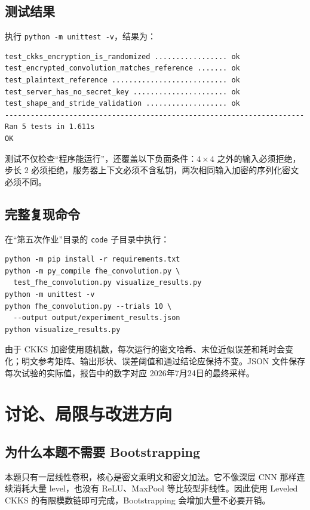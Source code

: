 \documentclass[UTF8,a4paper,zihao=-4]{ctexart}
\begin{document}
\subsection{测试结果}

执行 \texttt{python -m unittest -v}，结果为：

\begin{lstlisting}[style=datastyle]
test_ckks_encryption_is_randomized ................. ok
test_encrypted_convolution_matches_reference ....... ok
test_plaintext_reference ........................... ok
test_server_has_no_secret_key ...................... ok
test_shape_and_stride_validation ................... ok
----------------------------------------------------------------------
Ran 5 tests in 1.611s
OK
\end{lstlisting}

测试不仅检查“程序能运行”，还覆盖以下负面条件：$4\times4$ 之外的输入必须拒绝，步长 2 必须拒绝，服务器上下文必须不含私钥，两次相同输入加密的序列化密文必须不同。

\subsection{完整复现命令}

在“第五次作业”目录的 \texttt{code} 子目录中执行：

\begin{lstlisting}[style=datastyle]
python -m pip install -r requirements.txt
python -m py_compile fhe_convolution.py \
  test_fhe_convolution.py visualize_results.py
python -m unittest -v
python fhe_convolution.py --trials 10 \
  --output output/experiment_results.json
python visualize_results.py
\end{lstlisting}

由于 CKKS 加密使用随机数，每次运行的密文哈希、末位近似误差和耗时会变化；明文参考矩阵、输出形状、误差阈值和通过结论应保持不变。JSON 文件保存每次试验的实际值，报告中的数字对应 2026年7月24日的最终采样。

\section{讨论、局限与改进方向}

\subsection{为什么本题不需要 Bootstrapping}

本题只有一层线性卷积，核心是密文乘明文和密文加法。它不像深层 CNN 那样连续消耗大量 level，也没有 ReLU、MaxPool 等比较型非线性。因此使用 Leveled CKKS 的有限模数链即可完成，Bootstrapping 会增加大量不必要开销。
\end{document}
